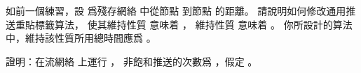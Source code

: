 \startANSWER
{}
\stopANSWER

\startEXERCISE\DIFFICULT
如前一個練習，設  爲殘存網絡  中從節點  到節點  的距離。
請說明如何修改通用推送重貼標籤算法，
使其維持性質  意味着 ，
維持性質  意味着 。
你所設計的算法中，維持該性質所用總時間應爲 。
\stopEXERCISE

\startANSWER
{}
\stopANSWER

\startEXERCISE\DIFFICULT
證明：在流網絡  上運行 ，
非飽和推送的次數爲 ，假定 。
\stopEXERCISE

\startANSWER
{}
\stopANSWER

\stopsection
